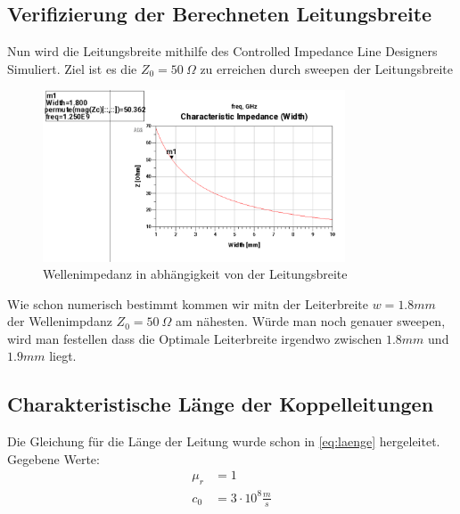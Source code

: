        

    \subsection{Verifizierung der Berechneten Leitungsbreite}
    Nun wird die Leitungsbreite mithilfe des Controlled Impedance Line Designers Simuliert.
    Ziel ist es die $Z_0 = 50~\Omega$ zu erreichen durch sweepen der Leitungsbreite
    \begin{figure}[H]
        \centering
        \includegraphics[width=0.8\textwidth]{Pictures/LeitungsbreitenSweep.png}
        \caption{Wellenimpedanz in abhängigkeit von der Leitungsbreite}
    \end{figure}
    Wie schon numerisch bestimmt kommen wir mitn der Leiterbreite $w=1.8mm$ der Wellenimpdanz $Z_0 = 50~\Omega$
    am nähesten. Würde man noch genauer sweepen, wird man festellen dass die Optimale Leiterbreite irgendwo zwischen
    $1.8mm$ und $1.9mm$ liegt.

        \subsection{Charakteristische Länge der Koppelleitungen}
    Die Gleichung für die Länge der Leitung wurde schon in \eqref{eq:laenge} hergeleitet.
    Gegebene Werte:
    \begin{align}
        \mu_r &= 1 \\
        c_0 &= 3 \cdot 10^8 \frac{m}{s}
    \end{align}

